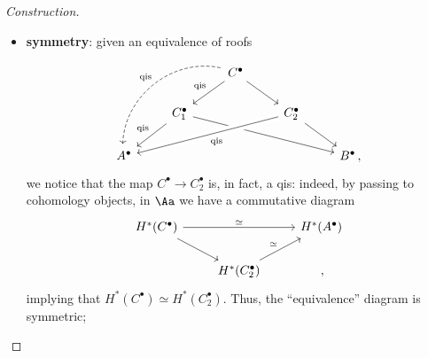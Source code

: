 \begin{thmdef}
\begin{proof}[Construction]
\begin{itemize}
            \item \textbf{symmetry}: given an equivalence of roofs
            \begin{equation*}
            \begin{tikzcd}
                & & C^{\bullet} \arrow[ld, "\textrm{qis}"'] \arrow[rd] 
                \arrow[lldd, "\textrm{qis}"', dashed, bend right=50, shift right] 
                & & \\
                & C_1^{\bullet} \arrow[ld, "\textrm{qis}"'] \arrow[rrrd] 
                & & C_2^{\bullet} \arrow[llld, "\textrm{qis}", crossing over] \arrow[rd] 
                & \\
                A^{\bullet} 
                &  &  &  & B^{\bullet}\,,
            \end{tikzcd}
            \end{equation*}
            we notice that the map $C^{\bullet} \to C^{\bullet}_{2}$ is, in fact, a qis:
            indeed, by passing to cohomology objects, in $\Aa$ we have
            a commutative diagram
            \begin{equation*}
                \begin{tikzcd}
                    H^*(C^{\bullet}) \ar[rr, "\simeq"] \ar[dr] 
                    & & H^*(A^{\bullet}) \\
                    & H^*(C_{2}^{\bullet}) \ar[ur, "\simeq"] & \,,
                \end{tikzcd}
            \end{equation*}
            implying that $H^*(C^{\bullet}) \simeq H^*(C_{2}^{\bullet})$.
            Thus, the ``equivalence'' diagram is symmetric;


\end{itemize}
\end{proof}
\end{thmdef}
